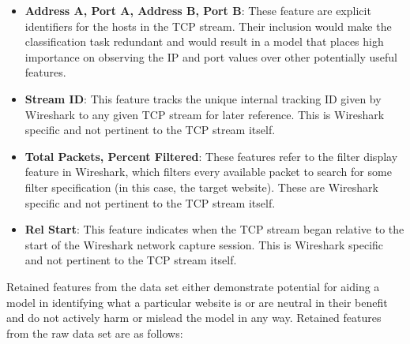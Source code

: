\documentclass[10pt,sigconf,letterpaper,nonacm]{acmart}
\begin{document}
\begin{itemize}
  \item \textbf{Address A, Port A, Address B, Port B}: These feature are explicit identifiers for the hosts in the TCP stream. Their inclusion would make the classification task redundant and would result in a model that places high importance on observing the IP and port values over other potentially useful features.
  
  \item \textbf{Stream ID}: This feature tracks the unique internal tracking ID given by Wireshark to any given TCP stream for later reference. This is Wireshark specific and not pertinent to the TCP stream itself.
  
  \item \textbf{Total Packets, Percent Filtered}: These features refer to the filter display feature in Wireshark, which filters every available packet to search for some filter specification (in this case, the target website). These are Wireshark specific and not pertinent to the TCP stream itself.
  
  \item \textbf{Rel Start}: This feature indicates when the TCP stream began relative to the start of the Wireshark network capture session. This is Wireshark specific and not pertinent to the TCP stream itself.
\end{itemize}

Retained features from the data set either demonstrate potential for aiding a model in identifying what a particular website is or are neutral in their benefit and do not actively harm or mislead the model in any way.
Retained features from the raw data set are as follows:
\end{document}
